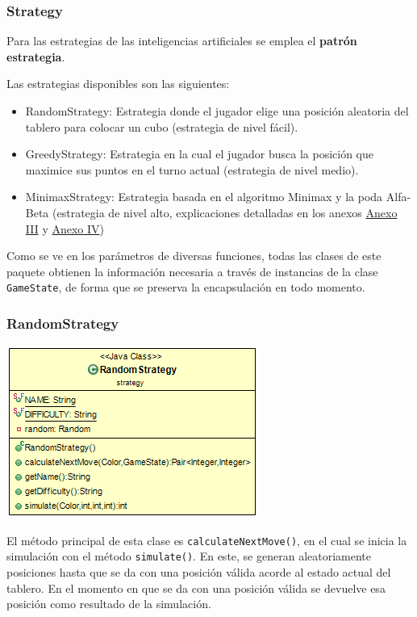 \documentclass[../DocumentoOficial.tex]{subfiles}
\begin{document}
\newpage

\subsubsection{Strategy}

Para las estrategias de las inteligencias artificiales se emplea el \textbf{patrón estrategia}.

Las estrategias disponibles son las siguientes:

\begin{itemize}
\item RandomStrategy: Estrategia donde el jugador elige una posición aleatoria del tablero para colocar un cubo (estrategia de nivel fácil).
\item GreedyStrategy: Estrategia en la cual el jugador busca la posición que maximice sus puntos en el turno actual (estrategia de nivel medio).
\item MinimaxStrategy: Estrategia basada en el algoritmo Minimax y la poda Alfa-Beta (estrategia de nivel alto, explicaciones detalladas en los anexos \hyperref[ch:AnexoIII]{Anexo III} y \hyperref[ch:AnexoIV]{Anexo IV}) 
\end{itemize}

Como se ve en los parámetros de diversas funciones, todas las clases de este paquete obtienen la información necesaria a través de instancias de la clase \texttt{GameState}, de forma que se preserva la encapsulación en todo momento.

\subsubsection{RandomStrategy}

\begin{center}
\includegraphics[scale=0.80]{RandomStrategy-sprint7.png} 
\end{center}

El método principal de esta clase es \texttt{calculateNextMove()}, en el cual se inicia la simulación con el método \texttt{simulate()}. En este, se generan aleatoriamente posiciones hasta que se da con una posición válida acorde al estado actual del tablero. En el momento en que se da con una posición válida se devuelve esa posición como resultado de la simulación.
\end{document}
